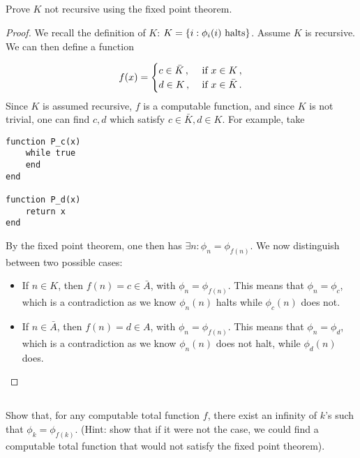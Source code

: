 \subsection{} %
Prove \(K\) not recursive using the fixed point theorem.

\begin{solution}
\begin{proof}
We recall the definition of \(K\):
\(K = \{i : \phi_i(i) \textnormal{ halts}\}\).
Assume \(K\) is recursive.
We can then define a function

\[
f(x) = \begin{cases} c \in \bar{K}\,, & \textnormal{ if } x \in K\,,\\
d \in K\,, & \textnormal{ if } x \in \bar{K}\,. \end{cases}
\]
Since \(K\) is assumed recursive,
\(f\) is a computable function,
and since \(K\) is not trivial,
one can find \(c, d\) which satisfy \(c \in \bar{K}, d \in K\).
For example, take
\begin{verbatim}
function P_c(x)
	while true
	end
end

function P_d(x)
	return x
end
\end{verbatim}
By the fixed point theorem, one then has
\(\exists n : \phi_n = \phi_{f(n)}\).
We now distinguish between two possible cases:
\begin{itemize}
	\item If \(n \in K\), then \(f(n) = c \in \bar{A}\),
	with \(\phi_n = \phi_{f(n)}\).
	This means that \(\phi_n = \phi_c\),
	which is a contradiction as we know \(\phi_n(n)\) halts
	while \(\phi_c(n)\) does not.
	\item If \(n \in \bar{A}\), then \(f(n) = d \in A\),
	with \(\phi_n = \phi_{f(n)}\).
	This means that \(\phi_n = \phi_d\),
	which is a contradiction as we know \(\phi_n(n)\) does not halt,
	while \(\phi_d(n)\) does.
\end{itemize}
\end{proof}
\end{solution}

\subsection{} %
Show that, for any computable total function \(f\),
there exist an infinity of \(k\)'s such that \(\phi_k = \phi_{f(k)}\).
(Hint: show that if it were not the case,
we could find a computable total function
that would not satisfy the fixed point theorem).


